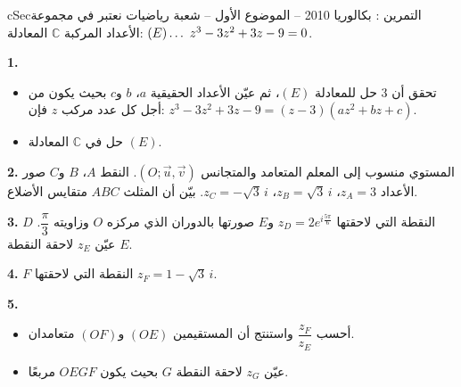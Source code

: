 \documentclass[12pt,a4paper]{article}
\newenvironment{BOX}[2]{\begin{otherlanguage}{english}\begin{arbox}{#1}{#2}}{\end{arbox}\end{otherlanguage}}
\newcounter{exo}
\newenvironment{tamrin}[1]{\stepcounter{exo}\begin{BOX}{cSec}{التمرين \theexo: #1}}{\end{BOX}}
\renewcommand{\ldots}{\mathinner{\ldotp\ldotp\ldotp}}
\newenvironment{sq}{\begin{itemize}[leftmargin=2.4em,itemsep=3pt]}{\end{itemize}}
\newcommand{\qa}{\item[(أ)]}\newcommand{\qb}{\item[(ب)]}\newcommand{\qc}{\item[(جـ)]}\newcommand{\qd}{\item[(د)]}\newcommand{\qe}{\item[(هـ)]}
\newcommand{\QQ}[1]{\par\smallskip\textbf{#1.} }
\begin{document}
\begin{tamrin}{بكالوريا 2010 -- الموضوع الأول -- شعبة رياضيات}
نعتبر في مجموعة الأعداد المركبة $\mathbb C$ المعادلة: $(E)\ldots\ z^3-3z^2+3z-9=0$.
\QQ{1}
\begin{sq}
\qa تحقق أن $3$ حل للمعادلة $(E)$، ثم عيّن الأعداد الحقيقية $a$، $b$ و$c$ بحيث يكون من أجل كل عدد مركب $z$ فإن: $z^3-3z^2+3z-9=(z-3)(az^2+bz+c)$.
\qb حل في $\mathbb C$ المعادلة $(E)$.
\end{sq}
\QQ{2} المستوي منسوب إلى المعلم المتعامد والمتجانس $(O;\vec u,\vec v)$. النقط $A$، $B$ و$C$ صور الأعداد $z_A=3$، $z_B=\sqrt3\,i$، $z_C=-\sqrt3\,i$. بيّن أن المثلث $ABC$ متقايس الأضلاع.
\QQ{3} $D$ النقطة التي لاحقتها $z_D=2e^{i\frac{5\pi}{6}}$ و$E$ صورتها بالدوران الذي مركزه $O$ وزاويته $\dfrac{\pi}{3}$. عيّن $z_E$ لاحقة النقطة $E$.
\QQ{4} $F$ النقطة التي لاحقتها $z_F=1-\sqrt3\,i$.
\QQ{5}
\begin{sq}
\qa أحسب $\dfrac{z_F}{z_E}$ واستنتج أن المستقيمين $(OE)$ و$(OF)$ متعامدان.
\qb عيّن $z_G$ لاحقة النقطة $G$ بحيث يكون $OEGF$ مربعًا.
\end{sq}
\end{tamrin}
\end{document}
